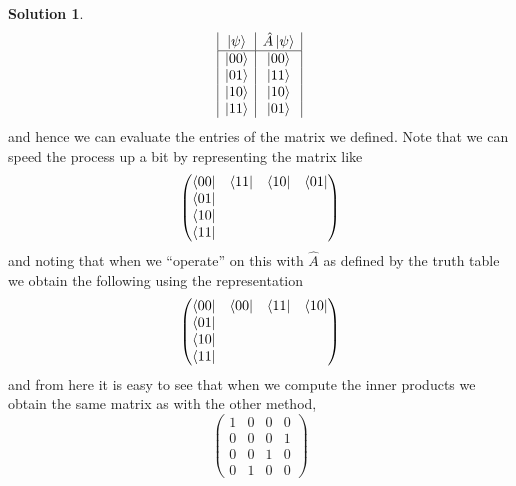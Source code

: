 \documentclass[10pt]{article}
\theoremstyle{definition}
\newtheorem{soln}{Solution}
\begin{document}
\begin{soln}
  $$
    \begin{array}{|c|c|}
      \ket{\psi} & \hat{A}\ket{\psi} \\
      \hline
      \ket{00}   & \ket{00}          \\
      \ket{01}   & \ket{11}          \\
      \ket{10}   & \ket{10}          \\
      \ket{11}   & \ket{01}
    \end{array}
  $$
  and hence we can evaluate the entries of the matrix we defined. Note that we can speed the process up a bit by representing the matrix like
  $$\begin{pmatrix}
      \bra{00} & \bra{11} & \bra{10} & \bra{01} \\
      \bra{01} &          &          &          \\
      \bra{10} &          &          &          \\
      \bra{11} &          &          &          \\
    \end{pmatrix}
  $$
  and noting that when we ``operate'' on this with $\hat{A}$ as defined by the truth table we obtain the following using the representation
  $$
    \begin{pmatrix}
      \bra{00} & \bra{00} & \bra{11} & \bra{10} \\
      \bra{01} &          &          &          \\
      \bra{10} &          &          &          \\
      \bra{11} &          &          &          \\
    \end{pmatrix}
  $$
  and from here it is easy to see that when we compute the inner products we obtain the same matrix as with the other method,
  $$
    \begin{pmatrix}
      1 & 0 & 0 & 0 \\
      0 & 0 & 0 & 1 \\
      0 & 0 & 1 & 0 \\
      0 & 1 & 0 & 0
    \end{pmatrix}
  $$
\end{soln}
\end{document}

